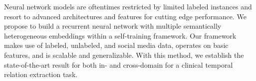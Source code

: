 Neural network models are oftentimes restricted by limited labeled instances and resort to advanced architectures and features for cutting edge performance. We propose to build a recurrent neural network with multiple semantically heterogeneous embeddings within a self-training framework. Our framework makes use of labeled, unlabeled, and social media data, operates on basic features, and is scalable and generalizable. With this method, we establish the state-of-the-art result for both in- and cross-domain for a clinical temporal relation extraction task.
